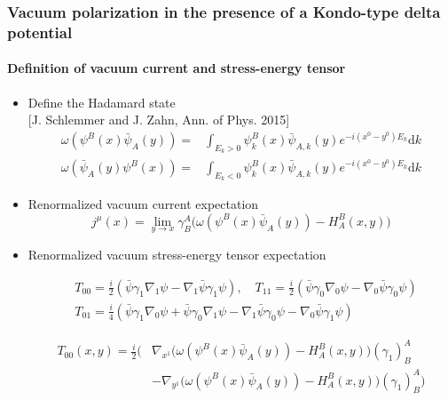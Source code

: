 \documentclass[english]{beamer}
\newcommand{\dd}[0]{\textrm{d}}
\begin{document}
\begin{frame}[shrink=30]
\frametitle{\small{Vacuum polarization in the presence of a Kondo-type delta potential}}
\framesubtitle{Definition of vacuum current and stress-energy tensor}

\begin{itemize}
\item<1-> Define the Hadamard state
\\\tiny\color{blue}[J. Schlemmer and J. Zahn, Ann. of Phys. 2015]\color{black}\normalsize
\begin{equation*}
\begin{split}
\omega(\psi^B(x)\bar{\psi}_A(y)) = & \int_{E_k >0} \psi_k^B(x)\bar{\psi}_{A,k}(y)e^{-i(x^0-y^0)E_k} \dd k \\
\omega(\bar{\psi}_A(y)\psi^B(x)) = & \int_{E_k <0} \psi_k^B(x)\bar{\psi}_{A,k}(y)e^{-i(x^0-y^0)E_k} \dd k 
\end{split}
\end{equation*}
%
\item<2-> Renormalized vacuum current expectation
\begin{equation*}
j^\mu(x) = \lim_{y \rightarrow x} \gamma^A_B \big(
\omega(\psi^B(x)\bar{\psi}_A(y)) - H^B_A (x, y)\big)
\end{equation*}

%
\item<3-> Renormalized vacuum stress-energy tensor expectation

\begin{equation*}
\begin{split}
& T_{00} = \frac{i}{2} (\bar{\psi} \gamma_1 \nabla_1 \psi - \nabla_1 \bar{\psi}\gamma_1 \psi) , \quad
 T_{11} = \frac{i}{2} (\bar{\psi} \gamma_0 \nabla_0 \psi - \nabla_0 \bar{\psi}\gamma_0 \psi)  \\
& T_{01} = \frac{i}{4} (\bar{\psi} \gamma_1 \nabla_0 \psi +\bar{\psi} \gamma_0 \nabla_1 \psi - \nabla_1 \bar{\psi}\gamma_0 \psi - \nabla_0 \bar{\psi}\gamma_1 \psi)  
\end{split}
\end{equation*}

\begin{equation*}
\begin{split}
T_{00}(x,y) = 
\frac{i}{2}\Big( & 
\nabla_{x^1}\big(\omega(  \psi^B(x) \bar{\psi}_A(y))-H^B_A(x,y)\big)(\gamma_1)^A_B \\
& - \nabla_{y^1}\Big(\omega( \psi^B(x)  \bar{\psi}_A(y)) - H^B_A(x,y)\big)(\gamma_1)^A_B \Big)   
\end{split}
\end{equation*}

\end{itemize}
\end{frame}
\end{document}
